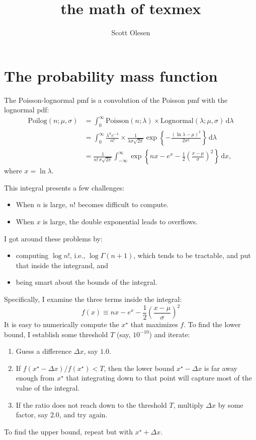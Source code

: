 \documentclass[10pt]{article}
\begin{document}
\title{the math of texmex}
\author{Scott Olesen}

\maketitle

\section{The probability mass function}
The Poisson-lognormal pmf is a convolution of the Poisson pmf with the lognormal pdf:
\begin{align}
    \mathrm{Poilog}(n; \mu, \sigma) &= \int_0^\infty \mathrm{Poisson}(n; \lambda) \times \mathrm{Lognormal}(\lambda; \mu, \sigma) \,\mathrm{d}\lambda \\
    &= \int_0^\infty \frac{\lambda^n e^{-\lambda}}{n!} \times \frac{1}{\lambda \sigma \sqrt{2 \pi}} \exp \left\{ -\frac{(\ln \lambda - \mu)^2}{2 \sigma^2} \right\} \,\mathrm{d}\lambda \\
    &= \frac{1}{n! \, \sigma \sqrt{2\pi}} \int_{-\infty}^\infty \exp \left\{ nx - e^x - \frac{1}{2} \left(\frac{x - \mu}{\sigma}\right)^2 \right\} \,\mathrm{d}x,
\end{align}
where $x = \ln \lambda$.

This integral presents a few challenges:
\begin{itemize}
\item When $n$ is large, $n!$ becomes difficult to compute.
\item When $x$ is large, the double exponential leads to overflows.
\end{itemize}
I got around these problems by:
\begin{itemize}
\item computing $\log n!$, i.e., $\log \Gamma(n + 1)$, which tends to be tractable, and put that
inside the integrand, and
\item being smart about the bounds of the integral.
\end{itemize}
Specifically, I examine the three terms inside the integral:
\begin{equation}
    f(x) \equiv nx - e^x - \frac{1}{2} \left(\frac{x - \mu}{\sigma}\right)^2
\end{equation}
It is easy to numerically compute the $x^\star$ that maximizes $f$. To find the lower bound, I establish
some threshold $T$ (say, $10^{-10}$) and iterate:
\begin{enumerate}
\item Guess a difference $\Delta x$, say $1.0$.
\item If $f(x^\star - \Delta x) / f(x^\star) < T$, then the lower bound $x^\star - \Delta x$ is far away
enough from $x^\star$ that integrating down to that point will capture most of the value of the integral.
\item If the ratio does not reach down to the threshold $T$, multiply $\Delta x$ by some factor, say $2.0$,
and try again.
\end{enumerate}
To find the upper bound, repeat but with $x^\star + \Delta x$.
\end{document}
